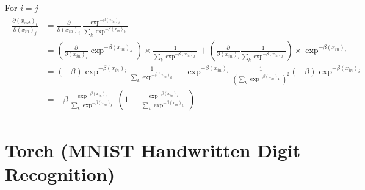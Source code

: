 \documentclass[paper=a4, fontsize=11pt]{scrartcl} %
\numberwithin{equation}{section} %
\numberwithin{figure}{section} %
\numberwithin{table}{section} %
\begin{document}
For $i = j$\\
\begin{align} 
\begin{split}
\frac{\partial (x_{out})_i}{\partial (x_{in})_j} &= \frac{\partial}{\partial (x_{in})_i} \frac{\exp^{-\beta(x_{in})_i}}{\sum_k{\exp^{-\beta(x_{in})_k}}}\\ 
&= (\frac{\partial}{\partial (x_{in})_i} \exp^{-\beta(x_{in})_k}) \times \frac{1}{\sum_k{\exp^{-\beta(x_{in})_k}}} +  (\frac{\partial}{\partial (x_{in})_i} \frac{1}{\sum_k{\exp^{-\beta(x_{in})_k}}}) \times \exp^{-\beta(x_{in})_i}\\
&= (-\beta)\exp^{-\beta{(x_{in})_i}} \frac{1}{\sum_k{\exp^{-\beta(x_{in})_k}}} - \exp^{-\beta(x_{in})_i} \frac{1}{(\sum_k{\exp^{-\beta(x_{in})_k}})^2} (-\beta) \exp^{-\beta(x_{in})_i}\\ 
&= -\beta \frac{\exp^{-\beta(x_{in})_i}}{\sum_k{\exp^{-\beta(x_{in})_k}}} (1 - \frac{\exp^{-\beta(x_{in})_i}}{\sum_k{\exp^{-\beta(x_{in})_k}}})
\end{split}         
\end{align}


\section{Torch (MNIST Handwritten Digit Recognition)}

\end{document}
